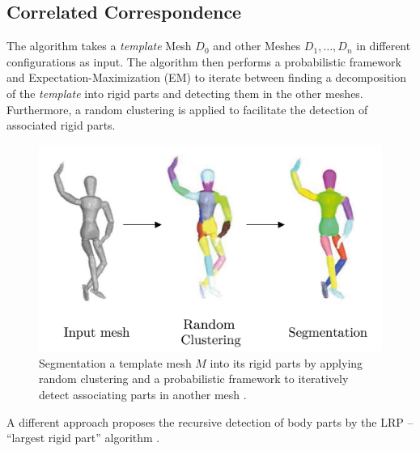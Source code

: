 \documentclass[notitlepage,english]{hgbreport}
\begin{document}
	\subsection{Correlated Correspondence}
	The algorithm takes a \textit{template} Mesh $D_0$ and other Meshes $D_1,\ldots,D_n$ in different configurations as input. The algorithm then performs a probabilistic framework and Expectation-Maximization (EM) to iterate between finding a decomposition of the \textit{template} into rigid parts and detecting them in the other meshes. Furthermore, a random clustering is applied to facilitate the detection of associated rigid parts.
	\begin{figure}
		\centering
		\includegraphics[width=0.7\linewidth]{anguelov}
		\caption{Segmentation a template mesh $M$ into its rigid parts by applying random clustering and a probabilistic framework to iteratively detect associating parts in another mesh \cite{Anguelov04}.}
		\label{fig:correlatedcorrespondance}
	\end{figure}
	 A different approach proposes the recursive detection of body parts by the LRP -- ``largest rigid part'' algorithm \cite {guo2016correspondence}. 
\end{document}
